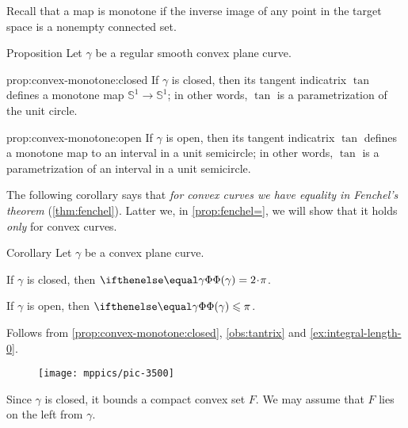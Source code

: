 Recall that a map is monotone if the inverse image of any point in the target space is a nonempty connected set.

\begin{thm}{Proposition}\label{prop:convex-monotone}
Let $\gamma$ be a regular smooth convex plane curve.

\begin{subthm}{prop:convex-monotone:closed}
If $\gamma$ is closed, then its tangent indicatrix $\tan$ defines a monotone map $\mathbb{S}^1\to \mathbb{S}^1$;
in other words, $\tan$ is a parametrization of the unit circle.
\end{subthm}

\begin{subthm}{prop:convex-monotone:open}
If $\gamma$ is open, then its tangent indicatrix $\tan$ defines a monotone map to an interval in a unit semicircle;
in other words, $\tan$ is a parametrization of an interval in a unit semicircle.
\end{subthm}

\end{thm}

The following corollary says that \textit{for convex curves we have equality in Fenchel's theorem} (\ref{thm:fenchel}).
Latter we, in \ref{prop:fenchel=}, we will show that it holds \textit{only} for convex curves.

\begin{thm}{Corollary}\label{cor:fenchel=convex}
Let $\gamma$ be a convex plane curve.

\begin{subthm}{}
If $\gamma$ is closed, then $\tc\gamma=2\cdot\pi$.
\end{subthm}

\begin{subthm}{}
If $\gamma$ is open, then $\tc\gamma\le\pi$.
\end{subthm}

\end{thm}

Follows from \ref{prop:convex-monotone:closed}, \ref{obs:tantrix} and \ref{ex:integral-length-0}.
\qeds

\begin{wrapfigure}{r}{32 mm}
\vskip-0mm
\centering
\texttt{[image: mppics/pic-3500]}
\vskip0mm
\end{wrapfigure}

Since $\gamma$ is closed, it bounds a compact convex set $F$.
We may assume that $F$ lies on the left from $\gamma$.

